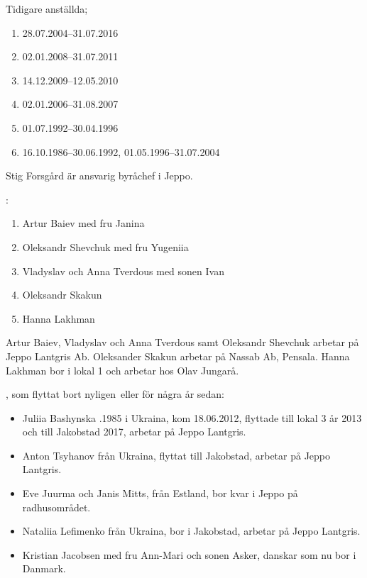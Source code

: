Tidigare anställda;
\begin{enumerate}
  \item {}    28.07.2004--31.07.2016
  \item {}            02.01.2008--31.07.2011
  \item {}      14.12.2009--12.05.2010
  \item {}     02.01.2006--31.08.2007
  \item {}           01.07.1992--30.04.1996
  \item {}          16.10.1986--30.06.1992, 01.05.1996--31.07.2004
\end{enumerate}
Stig Forsgård är ansvarig byråchef i Jeppo.


:
\begin{enumerate}
  \item Artur Baiev med fru Janina
  \item Oleksandr Shevchuk med fru Yugeniia
  \item Vladyslav och Anna Tverdous med sonen Ivan
  \item Oleksandr Skakun
  \item Hanna Lakhman
\end{enumerate}
Artur Baiev, Vladyslav och Anna Tverdous samt Oleksandr Shevchuk arbetar på Jeppo Lantgris Ab. Oleksander Skakun arbetar på Nassab Ab, Pensala. Hanna Lakhman bor i lokal 1 och arbetar hos Olav Jungarå.


, som flyttat bort nyligen eller för några år sedan:

\begin{itemize}
  \item Juliia Bashynska .1985 i Ukraina, kom 18.06.2012, flyttade till lokal 3 år 2013 och till Jakobstad 2017, arbetar på Jeppo Lantgris.
  \item Anton Tsyhanov från Ukraina, flyttat till Jakobstad, arbetar på Jeppo Lantgris.
  \item Eve Juurma och Janis Mitts, från  Estland, bor kvar i Jeppo på radhusområdet.
  \item Nataliia Lefimenko från Ukraina, bor i Jakobstad, arbetar på Jeppo Lantgris.
  \item Kristian Jacobsen med fru Ann-Mari och sonen Asker, danskar som nu bor i Danmark.
\end{itemize}

